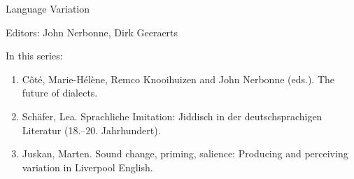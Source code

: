 {\large Language Variation}

\bigskip

Editors: John Nerbonne, Dirk Geeraerts

\bigskip

In this series:

\begin{enumerate}
\item Côté, Marie-Hélène, Remco Knooihuizen and John Nerbonne (eds.). The future of dialects.
\item Schäfer, Lea. Sprachliche Imitation: Jiddisch in der deutschsprachigen Literatur (18.–20. Jahrhundert). 
\item Juskan, Marten. Sound change, priming, salience: Producing and perceiving variation in Liverpool English.
\end{enumerate}



\vfill
 


